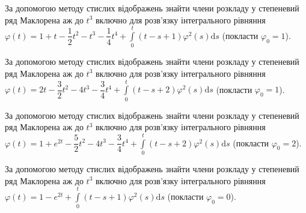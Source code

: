 \documentclass[12pt]{extarticle}
\begin{document}
\begin{Exercise}
За допомогою методу стислих відображень знайти члени розкладу у степеневий ряд Маклорена аж до $t^3$ включно для розв’язку інтегрального рівняння $\varphi (t) = 1 + t - \dfrac{1}{2} t^2 - t^3 - \dfrac{1}{4} t^4 + \int\limits_{0}^{t} (t - s + 1)\varphi^2(s) \mathrm{d}s$ (покласти $\varphi_0 = 1$).
\end{Exercise}

\begin{Exercise}
За допомогою методу стислих відображень знайти члени розкладу у степеневий ряд Маклорена аж до $t^3$ включно для розв’язку інтегрального рівняння $\varphi (t) = 2t - \dfrac{3}{2} t^2 - 4 t^3 - \dfrac{3}{4} t^4 + \int\limits_{0}^{t} (t - s + 2)\varphi^2(s) \mathrm{d}s$ (покласти $\varphi_0 = 1$).
\end{Exercise}

\begin{Exercise}
За допомогою методу стислих відображень знайти члени розкладу у степеневий ряд Маклорена аж до $t^3$ включно для розв’язку інтегрального рівняння $\varphi (t) = 1 + e^{2t} - \dfrac{5}{2} t^2 - 4 t^3 - \dfrac{3}{4} t^4 + \int\limits_{0}^{t} (t - s + 2)\varphi^2(s) \mathrm{d}s$ (покласти $\varphi_0 = 2$).
\end{Exercise}

\begin{Exercise}
За допомогою методу стислих відображень знайти члени розкладу у степеневий ряд Маклорена аж до $t^3$ включно для розв’язку інтегрального рівняння $\varphi (t) = 1 - e^{2t} + \int\limits_{0}^{t} (t - s + 1)\varphi^2(s) \mathrm{d}s$ (покласти $\varphi_0 = 0$).
\end{Exercise}
\end{document}
